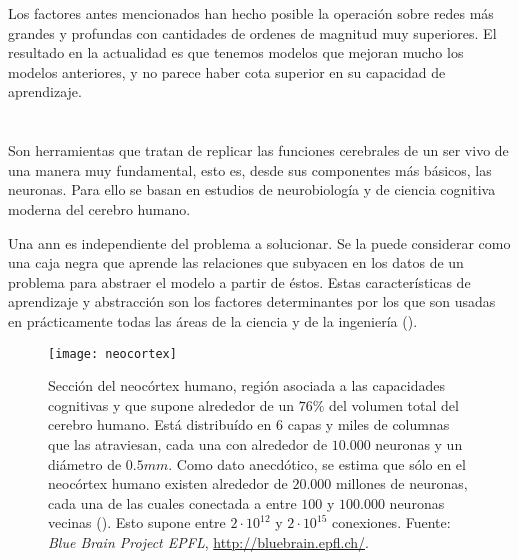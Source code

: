 Los factores antes mencionados han hecho posible la operación sobre redes más grandes y profundas con cantidades de ordenes de magnitud muy superiores. El resultado en la actualidad es que tenemos modelos que mejoran mucho los modelos anteriores, y no parece haber cota superior en su capacidad de aprendizaje.

\section{}

Son herramientas que tratan de replicar las funciones cerebrales de un ser vivo de una manera muy fundamental, esto es, desde sus componentes más básicos, las neuronas. Para ello se basan en estudios de neurobiología y de ciencia cognitiva moderna del cerebro humano.

Una \gls{ann} es independiente del problema a solucionar. Se la puede considerar como una caja negra que aprende las relaciones que subyacen en los datos de un problema para abstraer el modelo a partir de éstos. Estas características de aprendizaje y abstracción son los factores determinantes por los que son usadas en prácticamente todas las áreas de la ciencia y de la ingeniería (\cite{Du2006}).

\begin{figure}[t]
	\centering
	\texttt{[image: neocortex]}
	\caption[Ilustración de una sección del neocórtex humano]{Sección del neocórtex humano, región asociada a las capacidades cognitivas y que supone alrededor de un $76\%$ del volumen total del cerebro humano. Está distribuído en $6$ capas y miles de columnas que las atraviesan, cada una con alrededor de $10.000$ neuronas y un diámetro de $0.5mm$.  Como dato anecdótico, se estima que sólo en el neocórtex humano existen alrededor de $20.000$ millones de neuronas, cada una de las cuales conectada a entre $100$ y $100.000$ neuronas vecinas (\cite{Pakkenberg1997}). Esto supone entre $2 \cdot 10^{12}$ y $2 \cdot 10^{15}$ conexiones. Fuente: \textit{Blue Brain Project EPFL}, \url{http://bluebrain.epfl.ch/}.}
	\label{fig:neocortex}
\end{figure}

